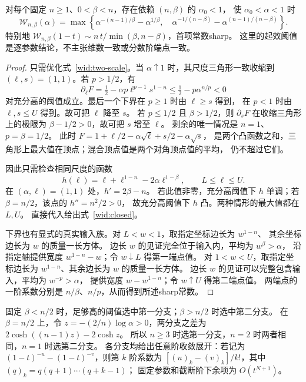 \begin{theorem}[任意固定维数和分数阶的显式高阈值宽度]\label{wid:endpoints}
对每个固定 $n\ge1$、$0<\beta<n$，存在依赖 $(n,\beta)$ 的 $\alpha_0<1$，
使 $\alpha_0<\alpha<1$ 时
\begin{equation}\label{wid:closed}
 \mathcal W_{n,\beta}(\alpha)=\max\left\{
 \alpha^{-(n-1)/\beta}-\alpha^{1/\beta},\quad
 \alpha^{-1/(n-\beta)}-\alpha^{(n-1)/(n-\beta)}\right\}.
\end{equation}
特别地
$\mathcal W_{n,\beta}(1-t)\sim n\,t/\min(\beta,n-\beta)$，首项常数sharp。
这里的起效阈值是逐参数结论，不主张维数一致或分数阶端点一致。
\end{theorem}
\begin{proof}
只需优化式~\eqref{wid:two-scale}。当 $\alpha\uparrow1$ 时，其尺度三角形一致收缩到
$(\ell,s)=(1,1)$。若 $p>1/2$，有
\[
 \partial_\ell F=\tfrac12-\alpha p\ell^{p-1}s^{1-n}
 \le\tfrac12-p\alpha^{n/p}<0
\]
对充分高的阈值成立。最后一个下界在 $p\ge1$ 时由 $\ell\ge s$ 得到，
在 $p<1$ 时由 $\ell,s\le U$ 得到。故可把 $\ell$ 降至 $s$。
若 $p\le1/2$ 且 $\beta>1/2$，则 $\partial_sF$ 在收缩三角形上的极限为
$\beta-1/2>0$，故可把 $s$ 增至 $\ell$。
剩余的唯一情况是 $n=1$、$p=\beta=1/2$。
此时
$F=1+\ell/2-\alpha\sqrt\ell+s/2-\alpha\sqrt s$，
是两个凸函数之和，三角形上最大值在顶点；混合顶点值是两个对角顶点值的平均，
仍不超过它们。

因此只需检查相同尺度的函数
\[
 h(\ell)=\ell+\ell^{1-n}-2\alpha\ell^{1-\beta},\qquad L\le\ell\le U.
\]
在 $(\alpha,\ell)=(1,1)$ 处，$h'=2\beta-n$。
若此值非零，充分高阈值下 $h$ 单调；若 $\beta=n/2$，该点的 $h''=n^2/2>0$，
故充分高阈值下 $h$ 凸。两种情形的最大值都在 $L,U$。
直接代入给出式~\eqref{wid:closed}。

下界也有显式的真实输入族。对 $L<w<1$，取指定坐标边长为 $w^{1-n}$、
其余坐标边长为 $w$ 的质量一长方体。
边长 $w$ 的见证完全位于输入内，平均为 $w^\beta>\alpha$，
沿指定轴提供宽度 $w^{1-n}-w$；令 $w\downarrow L$ 得第一端点值。
对 $1<w<U$，取指定坐标边长为 $w^{1-n}$、其余边长为 $w$ 的质量一长方体。
边长 $w$ 的见证可以完整包含输入，平均为 $w^{-p}>\alpha$，
提供宽度 $w-w^{1-n}$；令 $w\uparrow U$ 得第二端点值。
两端点的一阶系数分别是 $n/\beta$、$n/p$，从而得到所述sharp常数。
\end{proof}

固定 $\beta<n/2$ 时，足够高的阈值选中第一分支；$\beta>n/2$ 时选中第二分支。
在 $\beta=n/2$ 上，令 $z=-(2/n)\log\alpha>0$，两分支之差为
$2\cosh((n-1)z)-2\cosh z$。
所以 $n\ge3$ 时选第一分支，$n=2$ 时两者相同，$n=1$ 时选第二分支。
各分支均给出任意阶收敛展开：若记为 $(1-t)^{-u}-(1-t)^{-v}$，则第 $k$ 阶系数为
$[(u)_k-(v)_k]/k!$，其中 $(q)_k=q(q+1)\cdots(q+k-1)$；
固定参数和截断阶下余项为 $O(t^{N+1})$。

